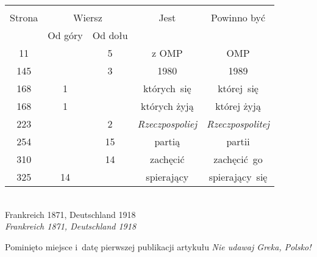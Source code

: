 \documentclass[a4paper,11pt]{article}
\begin{document}
\begin{center}

  \begin{tabular}{|c|c|c|c|c|}
    \hline
    & \multicolumn{2}{c|}{} & & \\
    Strona & \multicolumn{2}{c|}{Wiersz} & Jest
                              & Powinno być \\ \cline{2-3}
    & Od góry & Od dołu & & \\
    \hline
    11  & &  5 & z OMP & OMP \\
    145 & &  3 & 1980 & 1989 \\
    168 &  1 & & których~się & której~się \\
    168 &  1 & & których żyją & której żyją \\
    223 & &  2 & \textit{Rzeczpospoliej} & \textit{Rzeczpospolitej} \\
    254 & & 15 & partią & partii \\
    310 & & 14 & zachęcić & zachęcić~go \\
    325 & 14 & & spierający & spierający~się \\
    \hline
  \end{tabular}

\end{center}


\noindent
{} \\
\Jest  Frankreich 1871, Deutschland 1918 \\
\Powin \textit{Frankreich 1871, Deutschland 1918} \\


\vspace{\spaceTwo}














 Pominięto miejsce i~datę pierwszej publikacji
artykułu \textit{Nie udawaj Greka, Polsko!}
\end{document}
